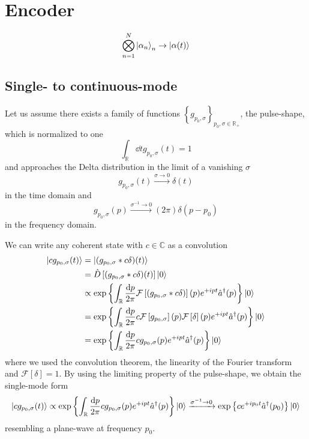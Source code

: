 \section{Encoder}

\begin{equation}
	\bigotimes_{n=1}^N
	\ket{\alpha_n}_n
	\to
	\ket{\alpha(t)}
\end{equation}

\subsection{Single- to continuous-mode}

Let us assume there exists a family of functions $\left\{g_{p_0,\sigma}\right\}_{p_0,\sigma\in\mathbb{R}_+}$, the pulse-shape, which is normalized to one
\begin{equation}
	\int_\mathbb{R}
	\dd{t}
	g_{p_0,\sigma}(t)
	=
	1	
\end{equation}
and approaches the Delta distribution in the limit of a vanishing $\sigma$
\begin{equation}
	g_{p_0,\sigma}(t)
	\xrightarrow{\sigma\to0}
	\delta(t)
\end{equation}
in the time domain and
\begin{equation}
	g_{p_0,\sigma}(p)
	\xrightarrow{\sigma^{-1}\to0}
	(2\pi)
	\delta(p-p_0)
\end{equation}
in the frequency domain.

We can write any coherent state with $c\in\mathbb{C}$ as a convolution
\begin{equation}
	\begin{split}
		\ket{cg_{p_0,\sigma}(t)}
		&=
		\ket{(g_{p_0,\sigma}*c\delta)(t)}
		\\
		&=
		\hat{D}\left[(g_{p_0,\sigma}*c\delta)(t)\right]
		\ket{0}
		\\
		&\propto
		\exp\left\{
			\int_\mathbb{R}
			\frac{\dd{p}}{2\pi}
			\mathcal{F}\left[(g_{p_0,\sigma}*c\delta)\right](p)
			e^{+ipt}
			\hat{a}^\dagger(p)
		\right\}
		\ket{0}
		\\
		&=
		\exp\left\{
			\int_\mathbb{R}
			\frac{\dd{p}}{2\pi}
			c
			\mathcal{F}\left[g_{p_0,\sigma}\right](p)
			\mathcal{F}\left[\delta\right](p)
			e^{+ipt}
			\hat{a}^\dagger(p)
		\right\}
		\ket{0}
		\\
		&=
		\exp\left\{
			\int_\mathbb{R}
			\frac{\dd{p}}{2\pi}
			cg_{p_0,\sigma}(p)
			e^{+ipt}
			\hat{a}^\dagger(p)
		\right\}
		\ket{0}
	\end{split}
\end{equation}
where we used the convolution theorem, the linearity of the Fourier transform and $\mathcal{F}[\delta]=1$.
By using the limiting property of the pulse-shape, we obtain the single-mode form
\begin{equation}
	\ket{cg_{p_0,\sigma}(t)}
	\propto
	\exp\left\{
		\int_\mathbb{R}
		\frac{\dd{p}}{2\pi}
		cg_{p_0,\sigma}(p)
		e^{+ipt}
		\hat{a}^\dagger(p)
	\right\}
	\ket{0}
	\xrightarrow{\sigma^{-1}\to0}
	\exp\left\{
		c
		e^{+ip_0t}
		\hat{a}^\dagger(p_0)
	\right\}
	\ket{0}
\end{equation}
resembling a plane-wave at frequency $p_0$.

